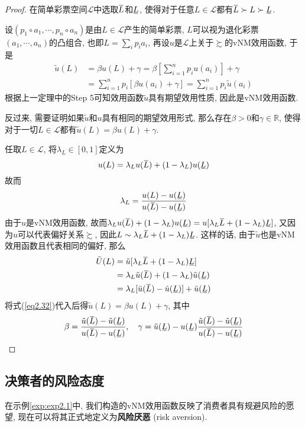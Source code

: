 \documentclass[cn, 12pt, math=mtpro2, bibstyle=apa, blue]{elegantbook}
\newcommand{\R}{\mathbb{R}}
\newcommand{\overbar}[1]{\mkern 1.5mu\overline{\mkern-1.5mu#1\mkern-1.5mu}\mkern 1.5mu}
\newcommand{\ubar}[1]{\mkern 1.5mu\underline{\mkern-1.5mu#1\mkern-1.5mu}\mkern 1.5mu}
\begin{document}
\begin{proof}
  在简单彩票空间$\mathscr{L}$中选取$\overbar{L}$和$\ubar{L}$, 使得对于任意$L\in\mathscr{L}$都有$\overbar{L}\succ L\succ \ubar{L}$. 
  
  设$(p_1\circ a_1,\cdots,p_n\circ a_n)$是由$L\in\mathscr{L}$产生的简单彩票, $L$可以视为退化彩票$(a_1,\cdots,a_n)$的凸组合, 也即$L=\sum_i p_ia_i$, 再设$u$是$\mathscr{L}$上关于$\succsim$的vNM效用函数, 于是
  \begin{align*}
  \tilde{u}(L)&=\beta u(L)+\gamma=\beta\left[\sum_{i=1}^{n}p_iu(a_i)\right]+\gamma \\
  &=\sum_{i=1}^{n}p_i[\beta u(a_i)+\gamma]=\sum_{i=1}^{n}p_i\tilde{u}(a_i)
  \end{align*}
  根据上一定理中的Step 5可知效用函数$\tilde{u}$具有期望效用性质, 因此是vNM效用函数.
  
  反过来, 需要证明如果$\tilde{u}$和$u$具有相同的期望效用形式, 那么存在$\beta>0$和$\gamma\in\R$, 使得对于一切$L\in\mathscr{L}$都有$\tilde{u}(L)=\beta u(L)+\gamma$.
  
  任取$L\in\mathscr{L}$, 将$\lambda_L\in[0,1]$定义为
  $$u(L)=\lambda_Lu(\overbar{L})+(1-\lambda_L)u(\ubar{L})$$
  故而
  \begin{equation}\label{eq2.32}
    \lambda_L=\frac{u(L)-u(\ubar{L})}{u(\overbar{L})-u(\ubar{L})}
  \end{equation}
  由于$u$是vNM效用函数, 故而$\lambda_Lu(\overbar{L})+(1-\lambda_L)u(\ubar{L})=u[\lambda_L\overbar{L}+(1-\lambda_L)\ubar{L}]$, 又因为$u$可以代表偏好关系$\succsim$, 因此$L\sim \lambda_L\overbar{L}+(1-\lambda_L)\ubar{L}$. 这样的话, 由于$\tilde{u}$也是vNM效用函数且代表相同的偏好, 那么
  \begin{align*}
  \tilde{U}(L)&=\tilde{u}[\lambda_L\overbar{L}+(1-\lambda_L)\ubar{L}] \\
  &=\lambda_L\tilde{u}(\overbar{L})+(1-\lambda_L)\tilde{u}(\ubar{L}) \\
  &=\lambda_L[\tilde{u}(\overbar{L})-\tilde{u}(\ubar{L})]+\tilde{u}(\ubar{L})
  \end{align*}
  将式(\ref{eq2.32})代入后得$\tilde{u}(L)=\beta u(L)+\gamma$, 其中
  $$\beta=\frac{\tilde{u}(\overbar{L})-\tilde{u}(\ubar{L})}{u(\overbar{L})-u(\ubar{L})},\quad \gamma=\tilde{u}(\ubar{L})-u(\ubar{L})\frac{\tilde{u}(\overbar{L})-\tilde{u}(\ubar{L})}{u(\overbar{L})-u(\ubar{L})}$$

\end{proof}

\subsection{决策者的风险态度}
在示例\ref{exp:exp2.1}中, 我们构造的vNM效用函数反映了消费者具有规避风险的愿望, 现在可以将其正式地定义为\textbf{风险厌恶} (risk aversion).
\end{document}
